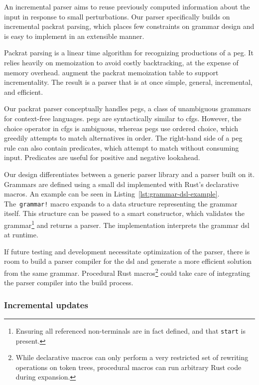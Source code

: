 An incremental parser aims to reuse previously computed information about the
input in response to small perturbations. Our parser specifically builds on
incremental packrat parsing\cite{dubroy2017incremental-packrat-parsing}, which
places few constraints on grammar design and is easy to implement in an
extensible manner.

Packrat parsing\cite{ford2002packrat} is a linear time algorithm for recognizing
productions of a \acrfull{peg}. It relies heavily on memoization to avoid costly
backtracking, at the expense of memory overhead.
 augment the packrat
memoization table to support incrementality. The result is a parser that is at
once simple, general, incremental, and efficient.

Our packrat parser conceptually handles \acrlong{peg}s\cite{ford2004parsing}, a
class of unambiguous grammars for context-free languages. \acrshort{peg}s are
syntactically similar to \acrlong{cfg}s. However, the choice operator in
\acrshort{cfg}s is ambiguous, whereas \acrshort{peg}s use ordered choice, which
greedily attempts to match alternatives in order. The right-hand side of a
\acrlong{peg} rule can also contain predicates, which attempt to match without
consuming input. Predicates are useful for positive and negative look\-ahead.

Our design differentiates between a generic parser library and a parser built on
it. Grammars are defined using a small \acrshort{dsl} implemented with Rust's
declarative macros. An example can be seen in
Listing~\ref{lst:grammar-dsl-example}. The~\texttt{grammar!} macro expands to a
data structure representing the grammar itself. This structure can be passed to
a smart constructor, which validates the grammar\footnote{Ensuring all
referenced non-terminals are in fact defined, and that \texttt{start} is
present.} and returns a parser. The implementation interprets the grammar
\acrshort{dsl} at runtime.

If future testing and development necessitate optimization of the parser, there
is room to build a parser compiler for the \acrshort{dsl} and generate a more
efficient solution from the same grammar. Procedural Rust macros\footnote{While
declarative macros can only perform a very restricted set of rewriting
operations on token trees, procedural macros can run arbitrary Rust code during
expansion.} could take care of integrating the parser compiler into the build
process.

\subsubsection*{Incremental updates}

